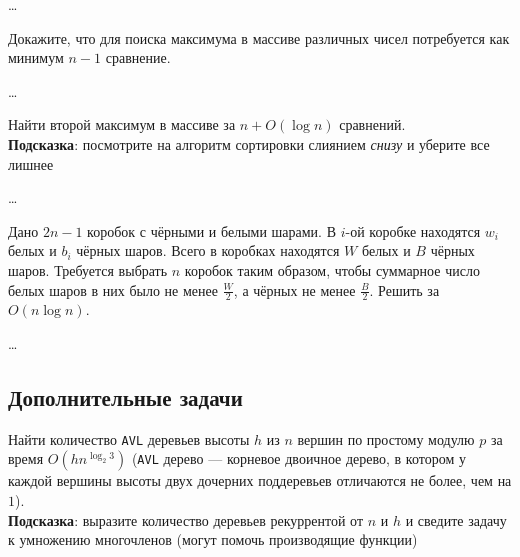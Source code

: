 \begin{solution}
    \dots
\end{solution}


\begin{problem}
    Докажите, что для поиска максимума в массиве различных чисел потребуется как минимум $n-1$ сравнение.
\end{problem}

\begin{solution}
    \dots
\end{solution}


\begin{problem}
    Найти второй максимум в массиве за $n + O(\log n)$ сравнений. \\
    {\footnotesize \textbf{Подсказка}: посмотрите на алгоритм сортировки слиянием \textit{снизу} и уберите все лишнее}
\end{problem}

\begin{solution}
    \dots
\end{solution}


\begin{problem}
    Дано $2n - 1$ коробок с чёрными и белыми шарами.  В $i$-ой коробке находятся $w_i$ белых и $b_i$ чёрных шаров.
    Всего в коробках находятся $W$ белых и $B$ чёрных шаров.
    Требуется выбрать $n$ коробок таким образом, чтобы суммарное число белых шаров в них было не менее $\frac{W}{2}$,
    а чёрных не менее $\frac{B}{2}$. Решить за $O(n \log n)$.
\end{problem}

\begin{solution}
    \dots
\end{solution}


\subsection*{Дополнительные задачи}

\begin{problem}
    Найти количество \texttt{AVL} деревьев высоты $h$ из $n$ вершин по простому модулю $p$ за время $O(h n^{\log_2 3})$
    (\texttt{AVL} дерево --- корневое двоичное дерево, в котором у каждой вершины высоты двух дочерних поддеревьев отличаются не более, чем на $1$).\\
    {
        \footnotesize \textbf{Подсказка}: выразите количество деревьев рекуррентой от $n$ и $h$ и сведите задачу к умножению многочленов
        (могут помочь производящие функции)
    }
\end{problem}


